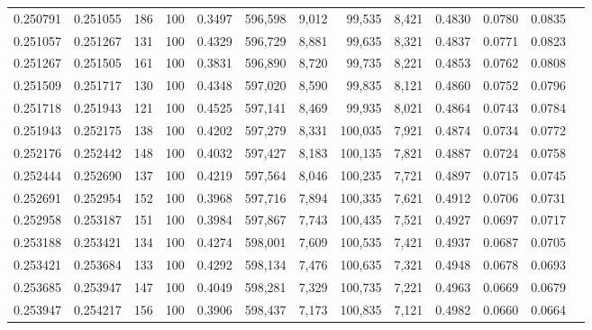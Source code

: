 \begin{tabular}{rrrrrrrrrrrrr}
0.250791 & 0.251055 &   186 & 100 &                                     0.3497 & 596,598 &   9,012 &  99,535 &   8,421 & 0.4830 & 0.0780 & 0.0835 \\
0.251057 & 0.251267 &   131 & 100 &                                     0.4329 & 596,729 &   8,881 &  99,635 &   8,321 & 0.4837 & 0.0771 & 0.0823 \\
0.251267 & 0.251505 &   161 & 100 &                                     0.3831 & 596,890 &   8,720 &  99,735 &   8,221 & 0.4853 & 0.0762 & 0.0808 \\
0.251509 & 0.251717 &   130 & 100 &                                     0.4348 & 597,020 &   8,590 &  99,835 &   8,121 & 0.4860 & 0.0752 & 0.0796 \\
0.251718 & 0.251943 &   121 & 100 &                                     0.4525 & 597,141 &   8,469 &  99,935 &   8,021 & 0.4864 & 0.0743 & 0.0784 \\
0.251943 & 0.252175 &   138 & 100 &                                     0.4202 & 597,279 &   8,331 & 100,035 &   7,921 & 0.4874 & 0.0734 & 0.0772 \\
0.252176 & 0.252442 &   148 & 100 &                                     0.4032 & 597,427 &   8,183 & 100,135 &   7,821 & 0.4887 & 0.0724 & 0.0758 \\
0.252444 & 0.252690 &   137 & 100 &                                     0.4219 & 597,564 &   8,046 & 100,235 &   7,721 & 0.4897 & 0.0715 & 0.0745 \\
0.252691 & 0.252954 &   152 & 100 &                                     0.3968 & 597,716 &   7,894 & 100,335 &   7,621 & 0.4912 & 0.0706 & 0.0731 \\
0.252958 & 0.253187 &   151 & 100 &                                     0.3984 & 597,867 &   7,743 & 100,435 &   7,521 & 0.4927 & 0.0697 & 0.0717 \\
0.253188 & 0.253421 &   134 & 100 &                                     0.4274 & 598,001 &   7,609 & 100,535 &   7,421 & 0.4937 & 0.0687 & 0.0705 \\
0.253421 & 0.253684 &   133 & 100 &                                     0.4292 & 598,134 &   7,476 & 100,635 &   7,321 & 0.4948 & 0.0678 & 0.0693 \\
0.253685 & 0.253947 &   147 & 100 &                                     0.4049 & 598,281 &   7,329 & 100,735 &   7,221 & 0.4963 & 0.0669 & 0.0679 \\
0.253947 & 0.254217 &   156 & 100 &                                     0.3906 & 598,437 &   7,173 & 100,835 &   7,121 & 0.4982 & 0.0660 & 0.0664 \\

\end{tabular}
